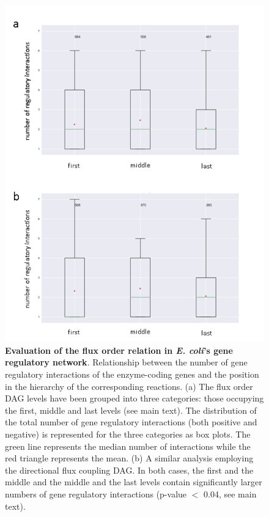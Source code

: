 \documentclass[12pt]{article}
\begin{document}
\begin{figure}
  \centering
  \includegraphics[scale=1]{Fig3.png}
  \caption{\small \textbf{Evaluation of the flux order relation in \emph{E. coli}'s gene regulatory network}. Relationship between the number of gene regulatory interactions of the enzyme-coding genes and the position in the hierarchy of the corresponding reactions. (a) The flux order DAG levels have been grouped into three categories: those occupying the first, middle and last levels (see main text). The distribution of the total number of gene regulatory interactions (both positive and negative) is represented for the three categories as box plots. The green line represents the median number of interactions while the red triangle represents the mean. (b) A similar analysis employing the directional flux coupling DAG. In both cases, the first and the middle and the middle and the last levels contain significantly larger numbers of gene regulatory interactions (p-value $<$ 0.04, see main text).}
  \label{fig:GRNorders}
\end{figure}
\end{document}
